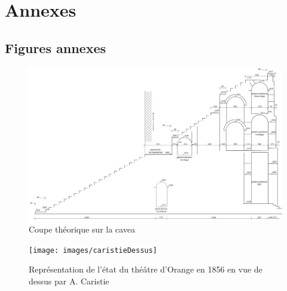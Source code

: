 \chapter{Annexes}



\section{Figures annexes}

\begin{figure}[!h]
	\includegraphics[width=\linewidth]{images/CoupeCavea}
	\caption[Coupe théorique sur la \gls{cavea}]{Coupe théorique sur la \gls{cavea} \cite[Pl. LX]{orangePl}} 
	\label{coupeCavea} 
\end{figure} 

\begin{figure}[!h]
	\texttt{[image: images/caristieDessus]}
	\caption[Vue de dessus par A. Caristie 1856]{Représentation de l'état du théâtre d'Orange en 1856 en vue de dessus par A. Caristie \cite[Pl. I]{orangePl}} 
	\label{caristieDessus} 
\end{figure} 
	
